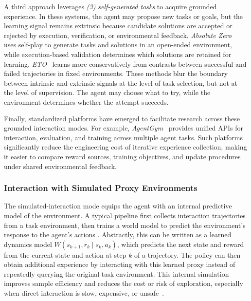 \documentclass{article}
\begin{document}
A third approach leverages \textit{(3) self-generated tasks} to acquire grounded experience. In these systems, the agent may propose new tasks or goals, but the learning signal remains extrinsic because candidate solutions are accepted or rejected by execution, verification, or environmental feedback. \textit{Absolute Zero}~\citep{zhao2025absolute} uses self-play to generate tasks and solutions in an open-ended environment, while execution-based validation determines which solutions are retained for learning. \textit{ETO}~\citep{song2024trial} learns more conservatively from contrasts between successful and failed trajectories in fixed environments. These methods blur the boundary between intrinsic and extrinsic signals at the level of task selection, but not at the level of supervision. The agent may choose what to try, while the environment determines whether the attempt succeeds.

Finally, standardized platforms have emerged to facilitate research across these grounded interaction modes. For example, \textit{AgentGym}~\citep{xi2024agentgym} provides unified APIs for interaction, evaluation, and training across multiple agent tasks. Such platforms significantly reduce the engineering cost of iterative experience collection, making it easier to compare reward sources, training objectives, and update procedures under shared environmental feedback.

\subsubsection{Interaction with Simulated Proxy Environments}
\label{sec:Efficient_Interaction_with_Simulated_Environments}
\label{sec:World_Models}


The simulated-interaction mode equips the agent with an internal predictive model of the environment. A typical pipeline first collects interaction trajectories from a task environment, then trains a world model to predict the environment's response to the agent's actions \citep{schmidhuber1990making, ha2018world}. Abstractly, this can be written as a learned dynamics model $W(s_{k+1}, r_k \mid s_k, a_k)$, which predicts the next state and reward from the current state and action at step $k$ of a trajectory. The policy can then obtain additional experience by interacting with this learned proxy instead of repeatedly querying the original task environment. This internal simulation improves sample efficiency and reduces the cost or risk of exploration, especially when direct interaction is slow, expensive, or unsafe~\citep{ding2025understanding, richens2025general}.
\end{document}
